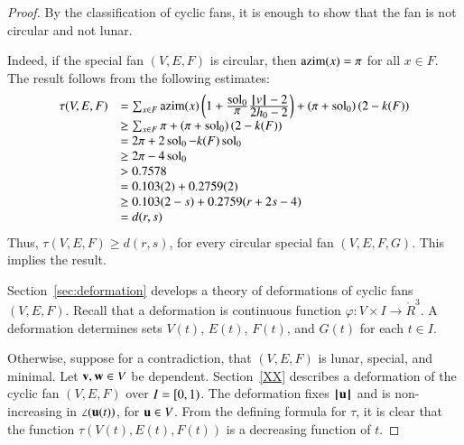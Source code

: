 \begin{proof}
By the classification of cyclic fans, it is enough to show that the fan is not circular and not lunar.

  Indeed,
if the special fan $(V,E,F)$ is circular, then ${\operatorname{azim}}(x) =\pi$ for all $x\in F$.
The result follows from the following estimates:
$$
\begin{array}{lll}
\tau(V,E,F) &=\sum_{x\in F} {\operatorname{azim}}(x)\left(1 + \frac{\displaystyle \operatorname{sol}_0}{\displaystyle \pi}  \frac{\displaystyle {{\hskip0.1em|\hskip-0.15em|\hskip0.1em}v{\hskip0.1em|\hskip-0.15em|\hskip0.1em}}-2}{\displaystyle 2{h_0}-2}\right) + \left(\pi+{\operatorname{sol}_0}\right) (2- k(F))\\
 &\ge \sum_{x\in F} \pi + \left(\pi+{\operatorname{sol}_0}\right) (2- k(F))\\
 &= 2\pi + 2\operatorname{sol}_0 - k(F) \operatorname{sol}_0\\
 &\ge 2\pi - 4\operatorname{sol}_0\\
&> 0.7578\\
&=0.103 (2) + 0.2759 (2)\\
&\ge 0.103 (2-s) + 0.2759 (r+2s-4) \\ 
&= d(r,s)\\
\end{array}
$$
Thus, $\tau(V,E,F)\ge d(r,s)$, for every circular special fan $(V,E,F,G)$.  This implies the result.

Section~\ref{sec:deformation} develops a theory of deformations of cyclic fans $(V,E,F)$.  Recall that a deformation is  continuous function $\varphi:V\times I\to\ring{R}^3$.  A deformation determines sets $V(t)$, $E(t)$, $F(t)$, and $G(t)$ for each $t\in I$.


  Otherwise,
suppose for a contradiction, that $(V,E,F)$ is lunar, special, and
minimal.  Let ${\mathbf v},{\mathbf w}\in V$ be dependent.   Section~\ref{XX} describes a deformation of the cyclic fan $(V,E,F)$
over $I=[0,1)$.  The deformation fixes ${{\hskip0.1em|\hskip-0.15em|\hskip0.1em}{\mathbf u}{\hskip0.1em|\hskip-0.15em|\hskip0.1em}}$
and is non-increasing in $\angle({\mathbf u}(t))$, for ${\mathbf u}\in V$.
From the defining formula for $\tau$, it is clear that the function $\tau(V(t),E(t),F(t))$ is a decreasing function of $t$.


\end{proof}
